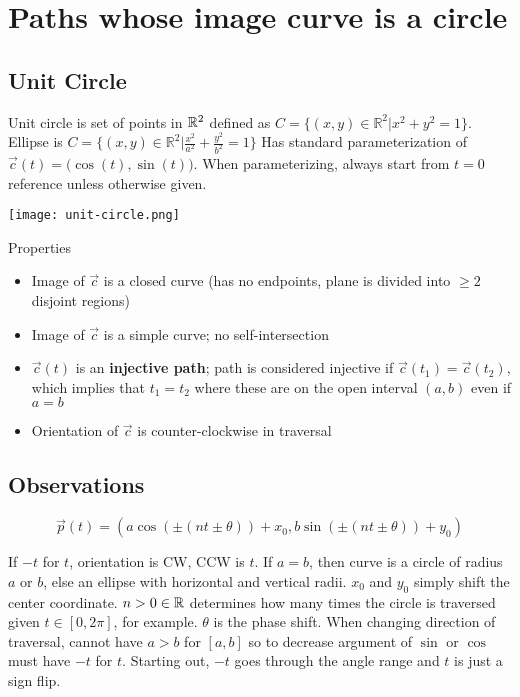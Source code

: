 \section{Paths whose image curve is a circle}

\subsection{Unit Circle}

Unit circle is set of points in $\mathbb{R}^2$ defined as $C=\{(x,y)\in\mathbb{R} ^2|x^2+y^2=1\}$. Ellipse is
$C=\{(x,y)\in\mathbb{R} ^2|\frac{x^2}{a^2}+\frac{y^2}{b^2}=1\}$
Has standard parameterization of $\vec{c}(t)=\big(\cos(t),\sin(t)\big)$.
When parameterizing, always start from $t=0$ reference unless otherwise given.\newline 

\begin{center}
    \texttt{[image: unit-circle.png]}
\end{center}

\noindent Properties
\begin{itemize}
    \item Image of $\vec{c}$ is a closed curve (has no endpoints, plane is divided into $\geq 2$ disjoint regions)
    \item Image of $\vec{c}$ is a simple curve; no self-intersection 
    \item $\vec{c}(t)$ is an \textbf{injective path}; path is considered injective if $\vec{c}(t_1)=\vec{c}(t_2)$, which implies that $t_1=t_2$ where 
    these are on the open interval $(a,b)$ even if $a=b$
    \item Orientation of $\vec{c}$ is counter-clockwise in traversal
\end{itemize}

\subsection{Observations}

\[\boxed{\vec{p}(t)=(a\cos (\pm (nt \pm\theta)) + x_0, b\sin (\pm (nt \pm \theta)) + y_0)}\]

If $-t$ for $t$, orientation is CW, CCW is $t$. If $a=b$, then curve is 
a circle of radius $a$ or $b$, else an ellipse with horizontal and vertical radii.
$x_0$ and $y_0$ simply shift the center coordinate. $n>0\in \mathbb{R}$ determines how many times
the circle is traversed given $t\in[0,2\pi]$, for example. $\theta$ is the phase shift.
When changing direction of traversal, cannot have $a>b$ for $[a,b]$ so to decrease argument of $\sin$ or $\cos$
must have $-t$ for $t$. Starting out, $-t$ goes through the angle range and $t$ is just a sign flip.

